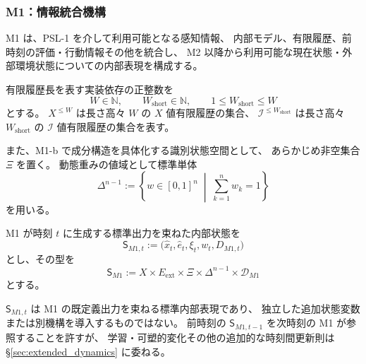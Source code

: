 \subsubsection{M1：情報統合機構}
\label{subsec:m1}

M1 は、PSL-1 を介して利用可能となる感知情報、
内部モデル、有限履歴、前時刻の評価・行動情報その他を統合し、
M2 以降から利用可能な現在状態・外部環境状態についての内部表現を構成する。

有限履歴長を表す実装依存の正整数を
\[
  W\in\mathbb N,
  \qquad
  W_{\mathrm{short}}\in\mathbb N,
  \qquad
  1\le W_{\mathrm{short}}\le W
\]
とする。
$X^{\le W}$ は長さ高々 $W$ の $X$ 値有限履歴の集合、
$\mathcal I^{\le W_{\mathrm{short}}}$ は長さ高々 $W_{\mathrm{short}}$ の
$\mathcal I$ 値有限履歴の集合を表す。

また、M1-b で成分構造を具体化する識別状態空間として、
あらかじめ非空集合 $\Xi$ を置く。
動態重みの値域として標準単体
\[
  \Delta^{n-1}
  :=
  \left\{
    w\in[0,1]^n
    \;\middle|\;
    \sum_{k=1}^{n}w_k=1
  \right\}
\]
を用いる。

\begin{definition}
\label{def:m1_state}
M1 が時刻 $t$ に生成する標準出力を束ねた内部状態を
\[
  \mathsf S_{M1,t}
  :=
  \bigl(
    \hat x_t,
    \hat e_t,
    \xi_t,
    w_t,
    D_{M1,t}
  \bigr)
\]
とし、その型を
\[
  \mathsf S_{M1}
  :=
  X
  \times E_{\mathrm{ext}}
  \times\Xi
  \times\Delta^{n-1}
  \times\mathcal D_{M1}
\]
とする。

$\mathsf S_{M1,t}$ は M1 の既定義出力を束ねる標準内部表現であり、
独立した追加状態変数または別機構を導入するものではない。
前時刻の $\mathsf S_{M1,t-1}$ を次時刻の M1 が参照することを許すが、
学習・可塑的変化その他の追加的な時刻間更新則は
\S\ref{sec:extended_dynamics} に委ねる。
\end{definition}

